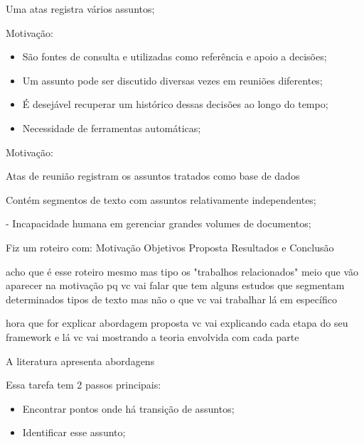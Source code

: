 	\item Uma atas registra vários assuntos;

Motivação:
\begin{itemize}
	\item São fontes de consulta e utilizadas como referência e apoio a decisões; 
	\item Um assunto pode ser discutido diversas vezes em reuniões diferentes;
	\item É desejável recuperar um histórico dessas decisões ao longo do tempo;
	\item Necessidade de ferramentas automáticas;
\end{itemize}

Motivação:


Atas de reunião registram os assuntos tratados  como base de dados


\item Contém segmentos de texto com assuntos relativamente independentes; 



- Incapacidade humana em gerenciar grandes volumes de documentos;








Fiz um roteiro com:
Motivação
Objetivos
Proposta
Resultados
e Conclusão


acho que é esse roteiro mesmo
mas tipo
os "trabalhos relacionados"
meio que vão aparecer na motivação
pq vc vai falar que tem alguns estudos que segmentam determinados tipos de texto
mas não o que vc vai trabalhar lá em específico





hora que for explicar abordagem proposta
vc vai explicando cada etapa do seu framework
e lá vc vai mostrando a teoria envolvida com cada parte












A literatura apresenta abordagens 


Essa tarefa tem 2 passos principais:
\begin{itemize}
	\item Encontrar pontos onde há transição de assuntos;
	\item Identificar esse assunto;
\end{itemize}







